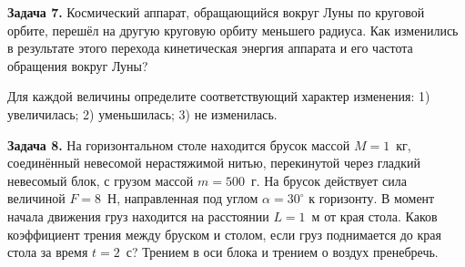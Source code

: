 \begin{taskbasic}[code={\label{task:newton2_v14_n6}}]
\textbf{Задача 7.} Космический аппарат, обращающийся вокруг Луны по круговой орбите, перешёл на другую круговую орбиту меньшего радиуса. Как изменились в результате этого перехода кинетическая энергия аппарата и его частота обращения вокруг Луны?

Для каждой величины определите соответствующий характер изменения:
1) увеличилась;
2) уменьшилась;
3) не изменилась.

\end{taskbasic}

\begin{taskbasic}[code={\label{task:newton2_v14_n26}}]
\textbf{Задача 8.} На горизонтальном столе находится брусок массой $M=1$~кг, соединённый невесомой нерастяжимой нитью, перекинутой через гладкий невесомый блок, с грузом массой $m=500$~г. На брусок действует сила величиной $F=8$~Н, направленная под углом $\alpha=30^{\circ}$ к горизонту. В момент начала движения груз находится на расстоянии $L=1$~м от края стола. Каков коэффициент трения между бруском и столом, если груз поднимается до края стола за время $t=2$~с? Трением в оси блока и трением о воздух пренебречь.

\nopagebreak\smallskip
\begin{center}
\end{center}
\end{taskbasic}
